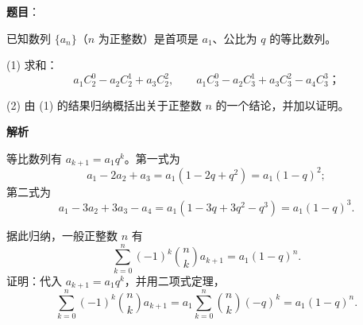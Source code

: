 \begin{answer}

\textbf{题目}：

已知数列 \(\{a_n\}\)（\(n\) 为正整数）是首项是 \(a_1\)、公比为 \(q\) 的等比数列。

    (1) 求和：
\nopagebreak[4]
\[
    a_1C_2^0-a_2C_2^1+a_3C_2^2,\qquad
    a_1C_3^0-a_2C_3^1+a_3C_3^2-a_4C_3^3\text{；}
\]

    (2) 由 (1) 的结果归纳概括出关于正整数 \(n\) 的一个结论，并加以证明。

\textbf{解析}


等比数列有 \(a_{k+1}=a_1q^k\)。第一式为
\nopagebreak[4]
\[
a_1-2a_2+a_3=a_1(1-2q+q^2)=a_1(1-q)^2;
\]
第二式为
\nopagebreak[4]
\[
a_1-3a_2+3a_3-a_4=a_1(1-3q+3q^2-q^3)=a_1(1-q)^3.
\]

据此归纳，一般正整数 \(n\) 有
\nopagebreak[4]
\[
\sum_{k=0}^{n}(-1)^k\binom nk a_{k+1}=a_1(1-q)^n.
\]
证明：代入 \(a_{k+1}=a_1q^k\)，并用二项式定理，
\nopagebreak[4]
\[
\sum_{k=0}^{n}(-1)^k\binom nk a_{k+1}
=a_1\sum_{k=0}^{n}\binom nk(-q)^k
=a_1(1-q)^n.
\]



\end{answer}
